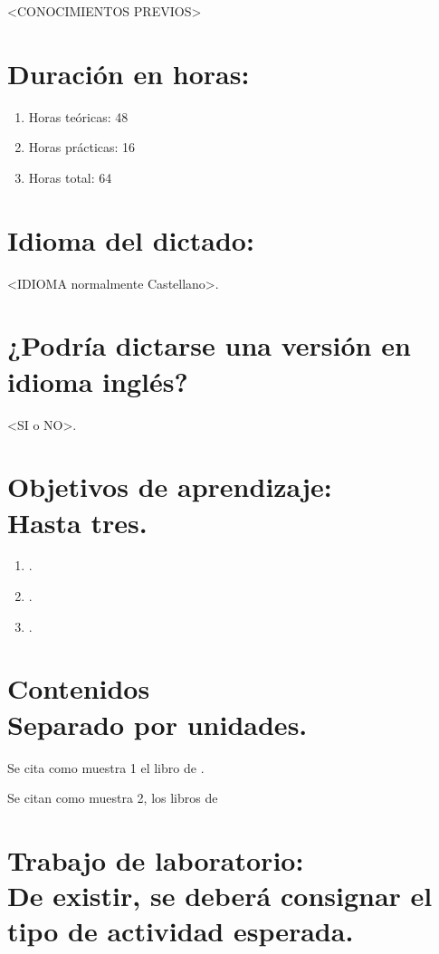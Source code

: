 \documentclass[a4paper,12pt]{article}
\begin{document}
<CONOCIMIENTOS PREVIOS>

\section{Duración en horas:}
\begin{enumerate}[label=\alph*-]
    \item Horas teóricas: 48 
    \item Horas prácticas: 16
    \item Horas total: 64
\end{enumerate}

\section{Idioma del dictado:}

<IDIOMA normalmente Castellano>.

\section{¿Podría dictarse una versión en idioma inglés?}

<SI o NO>.

\section{
Objetivos de aprendizaje: \\
{\tiny{\normalfont  Hasta tres.
}}}

\begin{enumerate}[label=\arabic*-]
    \item <OBJ1>.
    \item <OBJ2>.
    \item <OBJ3>.
\end{enumerate}

\section{ Contenidos \\ {{\normalfont \tiny Separado por unidades. }}}

Se cita como muestra 1 el libro de \cite{rssp:rob-sys}.

Se citan como muestra 2, los libros de \cite{paganini:rob-sys,doy:feed-cont}

\section{ Trabajo de laboratorio: \\ {{\normalfont \tiny De existir, se deberá consignar el tipo de actividad esperada. }}}
\end{document}
